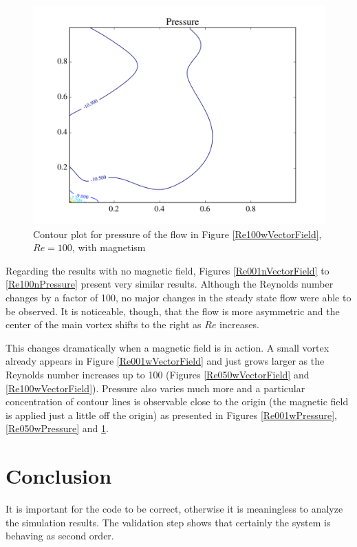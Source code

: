 \documentclass[journal]{IEEEtran}
\begin{document}
\begin{figure}[!t]
\centering
\includegraphics[width=\linewidth]{figures/Re100/w/pressure}
\caption{Contour plot for pressure of the flow in Figure \ref{Re100wVectorField}, $\mathit{Re}=100$, with magnetism \label{Re100wPressure}}
\end{figure}

Regarding the results with no magnetic field, Figures \ref{Re001nVectorField} to \ref{Re100nPressure} present very similar results. Although the Reynolds number changes by a factor of 100, no major changes in the steady state flow were able to be observed. It is noticeable, though, that the flow is more asymmetric and the center of the main vortex shifts to the right as $\mathit{Re}$ increases.

This changes dramatically when a magnetic field is in action. A small vortex already appears in Figure \ref{Re001wVectorField} and just grows larger as the Reynolds number increases up to 100 (Figures \ref{Re050wVectorField} and \ref{Re100wVectorField}). Pressure also varies much more and a particular concentration of contour lines is observable close to the origin (the magnetic field is applied just a little off the origin) as presented in Figures \ref{Re001wPressure}, \ref{Re050wPressure} and \ref{Re100wPressure}.


\section{Conclusion}

It is important for the code to be correct, otherwise it is meaningless to analyze the simulation results. The validation step shows that certainly the system is behaving as second order. 
\end{document}
